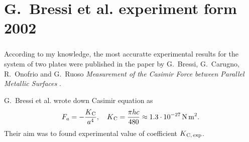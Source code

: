 \documentclass[10pt,t]{beamer}
\begin{document}
\section{G.~Bressi et al. experiment form 2002}



\begin{frame}
  \frametitle{}


  According to my knowledge, the most accuratte experimental results for
  the system of two plates were published in the paper by G.~Bressi,
  G.~Carugno, R.~Onofrio and G.~Ruoso \textit{Measurement of the Casimir
    Force between Parallel Metallic Surfaces} \parencite{}.

  G.~Bressi et al. wrote down Casimir equation as
  \begin{equation}
    \label{eq:Herdegens-approach-01}
    F_{ a } =
    -\frac{ K_{ \HorSpaceTwo \text{C} } }{ a^{ 4 } }, \quad
    K_{ \HorSpaceTwo \text{C} } = \frac{ \pi h c }{ 480 } \approx
    1.3 \cdot 10^{ -27 } \, \si{N.m^{ 2 }}.
  \end{equation}
  Their aim was to found experimental value of coefficient
  $K_{ \hspace{0.07em} \text{C}, \, \text{exp} }$.

\end{frame}
\end{document}

